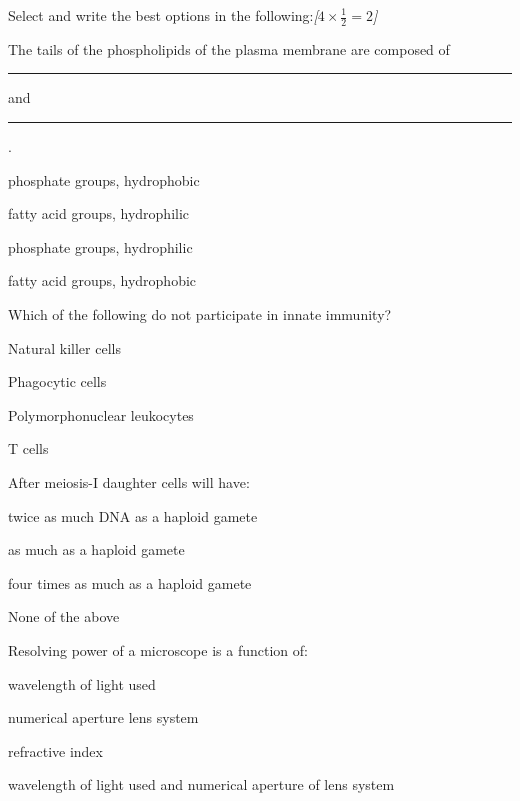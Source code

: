 \documentclass[11pt,a4paper]{article}
\newcommand{\pts}[1]{\hfill   \textit{[#1]}}
\begin{document}
\begin{parts}
  \item Select and write the best options in the following:\pts{$4  \times \frac{1}{2} = 2$}
  
\begin{parts}
    \item The tails of the phospholipids of the plasma membrane are composed of \rule{1.5cm}{0.4pt} and \rule{1.5cm}{0.4pt}.
    
\begin{choices}
      \item phosphate groups, hydrophobic
      \item fatty acid groups, hydrophilic
      \item phosphate groups, hydrophilic
      \item fatty acid groups, hydrophobic
    \end{choices}
    
    \item Which of the following do not participate in innate immunity?
    
\begin{choices}
      \item Natural killer cells
      \item Phagocytic cells
      \item Polymorphonuclear leukocytes
      \item T cells
    \end{choices}
    
    \item After meiosis-I daughter cells will have:
    
\begin{choices}
      \item twice as much DNA as a haploid gamete
      \item as much as a haploid gamete
      \item four times as much as a haploid gamete
      \item None of the above
    \end{choices}
    
    \item Resolving power of a microscope is a function of:
    
\begin{choices}
      \item wavelength of light used
      \item numerical aperture lens system
      \item refractive index
      \item wavelength of light used and numerical aperture of lens system
    \end{choices}
  \end{parts}
  

\end{parts}
\end{document}

